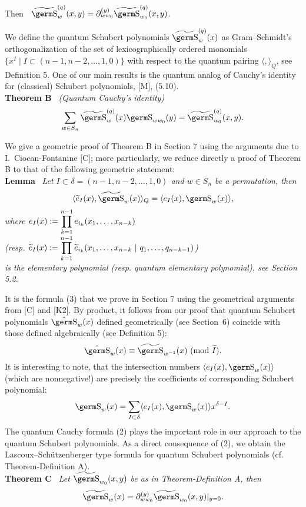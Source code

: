 {{Then \ $\wt{\s}_w^{(q)}(x,y)=\partial_{ww_0}^{(y)}\wt{\s}_{w_0}^{(q)}(x,y)$.}

We define the quantum Schubert polynomials $\wt{\s}_w^{(q)}(x)$ as 
Gram--Schmidt's orthogonalization of the set of lexicographically ordered 
monomials\break
$\{ x^I \mid I\subset (n-1,n-2,\ldots ,1,0) \}$
with respect to the quantum pairing $\langle ,\rangle_Q$, see 
Definition 5. One of our main results is the quantum analog of Cauchy's 
identity for (classical) Schubert polynomials, [M], (5.10). \medskip \\
{\bf Theorem B} \ {\it (Quantum Cauchy's identity)
\begin{equation}\sum_{w\in S_n}\wt{\s}_w^{(q)}(x)\s_{ww_0}(y)=
\wt{\s}_{w_0}^{(q)}(x,y).
\end{equation}}

We give a geometric proof of Theorem B in Section 7 using the arguments 
due to I.~Ciocan-Fontanine [C]; more particularly, we reduce directly a 
proof of Theorem B to that of the following geometric statement: \medskip \\
{\bf Lemma} \ {\it Let $I\subset\delta =(n-1,n-2,\ldots ,1,0)$ and $w\in 
S_n$ be a permutation, then
\begin{equation} \langle\wt e_I(x),\wt{\s}_w(x)\rangle_Q=\langle 
e_I(x),\s_w(x)\rangle ,
\end{equation}
where $e_I(x):=\displaystyle\prod_{k=1}^{n-1}e_{i_k}(x_1,\ldots ,x_{n-k})$\\
(resp. 
$\widetilde e_I(x):=\displaystyle\prod_{k=1}^{n-1}\widetilde e_{i_k}(x_1,\ldots ,x_{n-k}~|~q_1,\ldots 
,q_{n-k-1})$)\\ 
is the elementary polynomial (resp. quantum elementary 
polynomial), see Section 5.2.}

It is the formula (3) that we prove in Section 7 using the geometrical 
arguments from [C] and [K2]. By product, it follows from our proof that 
quantum Schubert polynomials $\hat{\s}_w(x)$ defined geometrically (see 
Section~6) coincide with those defined algebraically (see Definition 5):
$$\hat{\s}_w(x) \equiv \wt{\s}_{w^{-1}}(x) \ (\mod \wt I).
$$
It is interesting to note, that the intersection numbers $\langle 
e_I(x),\s_w(x)\rangle$ (which are nonnegative!) are precisely the 
coefficients of corresponding Schubert polynomial:
$$\s_w(x)=\sum_{I\subset\delta}\langle e_I(x),\s_w(x)\rangle x^{\delta 
-I}.
$$
The quantum Cauchy formula (2) plays the important role in our approach 
to the quantum Schubert polynomials. As a direct consequence of (2), we 
obtain the Lascoux--Sch\"utzenberger type formula for quantum Schubert 
polynomials (cf. Theorem-Definition A). \medskip \\
{\bf Theorem C} \ {\it Let $\wt{\s}_{w_0}(x,y)$ be as in 
Theorem-Definition A, then}
$$\wt{\s}_{w}(x)=\partial_{ww_0}^{(y)}\wt{\s}_{w_0}(x,y)|_{y=0}.
$$

}
